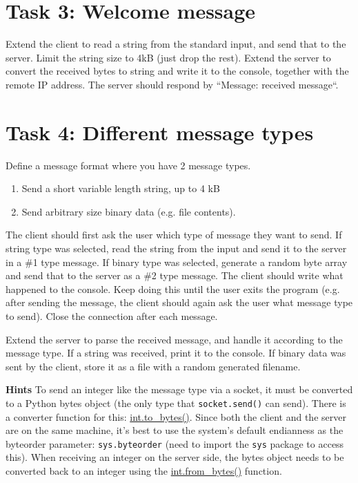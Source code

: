 \section*{Task 3: Welcome message}

Extend the client to read a string from the standard input, and send that to the server. Limit the string size to 4kB (just drop the rest).
Extend the server to convert the received bytes to string and write it to the console, together with the remote IP address. The server should respond by “Message: {received message}“. 

\section*{Task 4: Different message types}

Define a message format where you have 2 message types.
\begin{enumerate}
\item Send a short variable length string, up to 4 kB
\item Send arbitrary size binary data (e.g. file contents). 
\end{enumerate}

The client should first ask the user which type of message they want to send. If string type was selected, read the string from the input and send it to the server in a \#1 type message. If binary type was selected, generate a random byte array and send that to the server as a \#2 type message. The client should write what happened to the console. Keep doing this until the user exits the program (e.g. after sending the message, the client should again ask the user what message type to send). Close the connection after each message.

Extend the server to parse the received message, and handle it according to the message type. If a string was received, print it to the console. If binary data was sent by the client, store it as a file with a random generated filename.

\textbf{Hints}
To send an integer like the message type via a socket, it must be converted to a Python bytes object (the only type that \texttt{socket.send()} can send). There is a converter function for this: \href{https://docs.python.org/3.2/library/stdtypes.html\#int.to\_bytes}{int.to\_bytes()}. Since both the client and the server are on the same machine, it’s best to use the system’s default endianness as the byteorder parameter: \texttt{sys.byteorder} (need to import the \texttt{sys} package to access this). When receiving an integer on the server side, the bytes object needs to be converted back to an integer using the \href{https://docs.python.org/3.2/library/stdtypes.html\#int.from\_bytes}{int.from\_bytes()} function.

